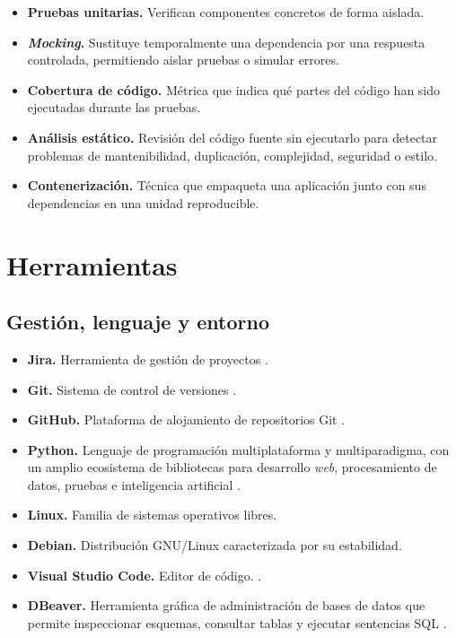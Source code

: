 \begin{itemize}
	\item \textbf{Pruebas unitarias.} Verifican componentes concretos de forma aislada.
	
	\item \textbf{\textit{Mocking}.} Sustituye temporalmente una dependencia por una respuesta controlada, permitiendo aislar pruebas o simular errores.
	
	\item \textbf{Cobertura de código.} Métrica que indica qué partes del código han sido ejecutadas durante las pruebas.
	
	\item \textbf{Análisis estático.} Revisión del código fuente sin ejecutarlo para detectar problemas de mantenibilidad, duplicación, complejidad, seguridad o estilo.
	
	\item \textbf{Contenerización.} Técnica que empaqueta una aplicación junto con sus dependencias en una unidad reproducible.
\end{itemize}

\section{Herramientas}

\subsection{Gestión, lenguaje y entorno}

\begin{itemize}
	\item \textbf{Jira.} Herramienta de gestión de proyectos \cite{jira_docs}.
	
	\item \textbf{Git.} Sistema de control de versiones \cite{git_docs}.
	
	\item \textbf{GitHub.} Plataforma de alojamiento de repositorios Git \cite{github_docs}.
	
	\item \textbf{Python.} Lenguaje de programación multiplataforma y multiparadigma, con un amplio ecosistema de bibliotecas para desarrollo \textit{web}, procesamiento de datos, pruebas e inteligencia artificial \cite{python_docs}.
	
	\item \textbf{Linux.} Familia de sistemas operativos libres.
	
	\item \textbf{Debian.} Distribución GNU/Linux caracterizada por su estabilidad\cite{debian_docs}.
	
	\item \textbf{Visual Studio Code.} Editor de código. \cite{vscode_docs}.
	
	\item \textbf{DBeaver.} Herramienta gráfica de administración de bases de datos que permite inspeccionar esquemas, consultar tablas y ejecutar sentencias SQL \cite{dbeaver_docs}.
\end{itemize}

